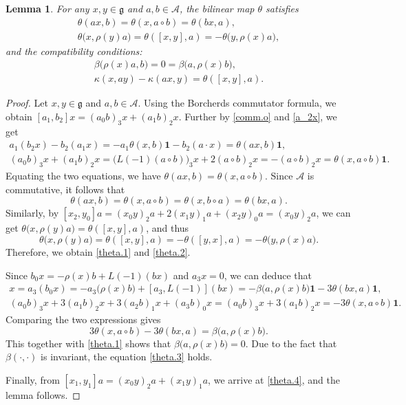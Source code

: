 \documentclass[12pt]{article}
\numberwithin{equation}{section}
\newtheorem{lemma}[theorem]{Lemma}
\theoremstyle{definition}
\theoremstyle{plain}
\newcommand{\fg}{\mathfrak{g}}
\newcommand{\cA}{\ensuremath{\mathcal{A}}}
\newcommand{\bone}{\mathbf{1 }}
\begin{document}
\begin{lemma}\label{lem:theta}
    For any $x,y\in\fg$ and $a,b\in \cA$, the bilinear map $\theta$ satisfies
    \begin{gather}
        \theta(ax,b)=\theta(x,a\circ b)=\theta(bx,a),\label{theta.1}\\
        \theta\big(x,\rho(y)a\big)=\theta([x,y],a)=-\theta\big(y,\rho(x)a\big),\label{theta.2}
    \end{gather}
    and the compatibility conditions\textup{:}
    \begin{gather}
        \beta\big(\rho(x)a,b\big)=0=\beta\big(a,\rho(x)b\big),\label{theta.3}\\
        \kappa(x,ay)-\kappa(ax,y)=\theta([x,y],a).\label{theta.4}
    \end{gather}
\end{lemma}
\begin{proof}
    Let $x,y\in\fg$ and $a,b\in \cA$. Using the Borcherds commutator formula, we obtain $[a_1,b_2]x=(a_0b)_3x+(a_1b)_2x$. Further by \eqref{comm.o} and \eqref{a_2x}, we get
    \begin{gather*}
        a_1(b_2x)-b_2(a_1x)=-a_1\theta(x,b)\bone-b_2(a\cdot x)=\theta(ax,b)\bone,\\
        (a_0b)_3x+(a_1b)_2x=\big(L(-1)(a\circ b)\big)_3x+2(a\circ b)_2x=-(a\circ b)_2x=\theta(x,a\circ b)\bone.
    \end{gather*}
    Equating the two equations, we have $\theta(ax,b)=\theta(x,a\circ b)$. Since $\cA$ is commutative, it follows that
    \begin{equation*}
        \theta(ax,b)=\theta(x,a\circ b)=\theta(x,b\circ a)=\theta(bx,a).
    \end{equation*}
    Similarly, by $[x_2,y_0]a=(x_0y)_2a+2(x_1y)_1a+(x_2y)_0a=(x_0y)_2a$, we can get $\theta\big(x,\rho(y)a\big)=\theta([x,y],a)$, and thus
    \begin{equation*}
        \theta\big(x,\rho(y)a\big)=\theta([x,y],a)=-\theta([y,x],a)=-\theta\big(y,\rho(x)a\big).
    \end{equation*}
    Therefore, we obtain \eqref{theta.1} and \eqref{theta.2}.

    Since $b_0x=-\rho(x)b+L(-1)(bx)$ and $a_3x=0$, we can deduce that
    \begin{gather*}
        [a_3,b_0]x=a_3(b_0x)=-a_3\big(\rho(x)b\big)+[a_3,L(-1)](bx)=-\beta\big(a,\rho(x)b\big)\bone-3\theta(bx,a)\bone,\\
        (a_0b)_3x+3(a_1b)_2x+3(a_2b)_1x+(a_3b)_0x=(a_0b)_3x+3(a_1b)_2x=-3\theta(x,a\circ b)\bone.
    \end{gather*}
    Comparing the two expressions gives
    \begin{equation*}
        3\theta(x,a\circ b)-3\theta(bx,a)=\beta\big(a,\rho(x)b\big).
    \end{equation*}
    This together with \eqref{theta.1} shows that $\beta\big(a,\rho(x)b\big)=0$. Due to the fact that $\beta(\cdot,\cdot)$ is invariant, the equation \eqref{theta.3} holds.

    Finally, from $[x_1,y_1]a=(x_0y)_2a+(x_1y)_1a$, we arrive at \eqref{theta.4}, and the lemma follows.
\end{proof}
\end{document}
